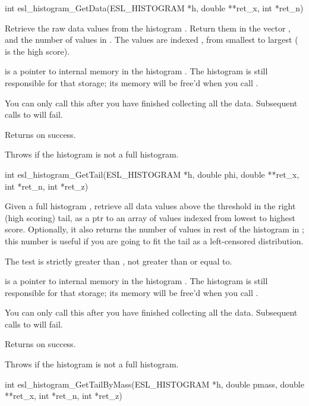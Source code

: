 \begin{sreapi}
\hypertarget{func:esl_histogram_GetData()}
{\item[int esl\_histogram\_GetData(ESL\_HISTOGRAM *h, double **ret\_x, int *ret\_n)]}

Retrieve the raw data values from the histogram .
Return them in the vector , and the number
of values in . The values are indexed \ccode{[0..n-1]},
from smallest to largest ( is the high score).

 is a pointer to internal memory in the histogram .
The histogram  is still responsible for that storage;
its memory will be free'd when you call
.

You can only call this after you have finished collecting
all the data. Subsequent calls to 
will fail.

Returns  on success.

Throws  if the histogram  is not a full histogram.


\hypertarget{func:esl_histogram_GetTail()}
{\item[int esl\_histogram\_GetTail(ESL\_HISTOGRAM *h, double phi, 
		      double **ret\_x, int *ret\_n, int *ret\_z)]}

Given a full histogram , retrieve all data values 
above the threshold  in the right (high scoring) 
tail, as a ptr  to an array of  values 
indexed \ccode{[0..n-1]} from lowest to highest score. 
Optionally, it also returns the number of values in 
rest of the histogram in ;
this number is useful if you are going to fit
the tail as a left-censored distribution.

The test is strictly greater than , not greater
than or equal to.

 is a pointer to internal memory in the histogram .
The histogram  is still responsible for that storage;
its memory will be free'd when you call 
.

You can only call this after you have finished collecting
all the data. Subsequent calls to 
will fail.             

Returns  on success.

Throws  if the histogram is not a full histogram.


\hypertarget{func:esl_histogram_GetTailByMass()}
{\item[int esl\_histogram\_GetTailByMass(ESL\_HISTOGRAM *h, double pmass,
			    double **ret\_x, int *ret\_n, int *ret\_z)]}


\end{sreapi}
